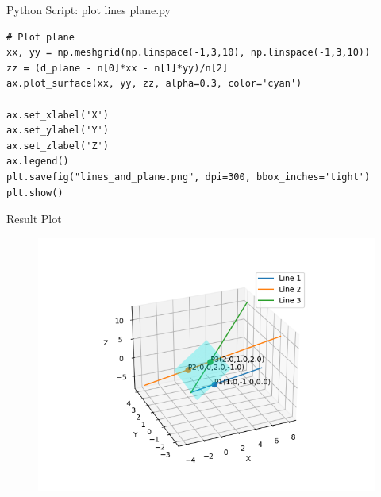 \documentclass{beamer}
\numberwithin{equation}{section}
\theoremstyle{remark}
\begin{document}
\begin{frame}[fragile]{Python Script: plot lines plane.py}
\begin{verbatim}
# Plot plane
xx, yy = np.meshgrid(np.linspace(-1,3,10), np.linspace(-1,3,10))
zz = (d_plane - n[0]*xx - n[1]*yy)/n[2]
ax.plot_surface(xx, yy, zz, alpha=0.3, color='cyan')

ax.set_xlabel('X')
ax.set_ylabel('Y')
ax.set_zlabel('Z')
ax.legend()
plt.savefig("lines_and_plane.png", dpi=300, bbox_inches='tight')
plt.show()
\end{verbatim}
\end{frame}

\begin{frame}{Result Plot}
 \begin{figure}[H]
     \centering
     \includegraphics[width=0.7\columnwidth]{figs/fig1.png}
     \caption*{}
     \label{fig:fig1}
 \end{figure}
 
\end{frame}
\end{document}
